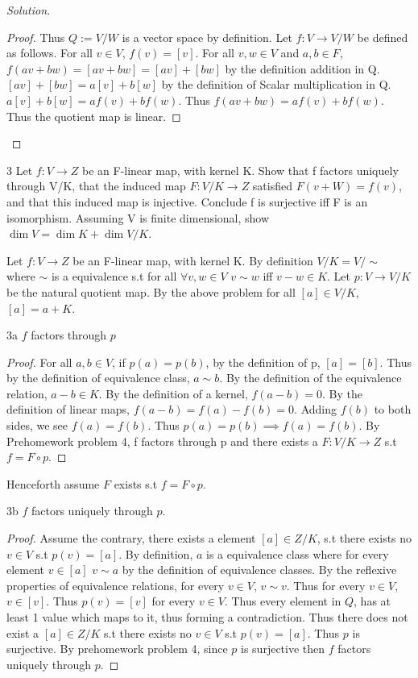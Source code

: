 \documentclass{article}
\newcommand{\rarr}[0]{\rightarrow}
\newenvironment{solution}
{\renewcommand\qedsymbol{$\blacksquare$}\begin{proof}[Solution]}
		{\end{proof}}
\begin{document}
\begin{solution}
\begin{proof}
		Thus $Q := V/W$ is a vector space by definition. Let $f : V \rarr V/W$ be defined as follows. For all $v \in V$, $f(v) = [v]$. For all $v, w \in V$ and $a, b \in F$, $f(av + bw) = [av + bw] = [av] + [bw]$ by the definition addition in Q. $[av] + [bw] = a[v] + b[w]$ by the definition of Scalar multiplication in Q. $a[v] + b[w] = af(v) + bf(w)$. Thus $f(av + bw) = af(v) + bf(w)$. Thus the quotient map is linear.
	\end{proof}
\end{solution}

\bigskip

\begin{PROB}{3}\label{Problem 3.}
    Let $f: V \rarr Z$ be an F-linear map, with kernel K. Show that f factors uniquely through V/K, that the induced map $F: V/K \rarr Z$ satisfied $F(v + W) = f(v)$, and that this induced map is injective. Conclude f is surjective iff F is an isomorphism.  Assuming V is finite dimensional, show $\dim V = \dim K + \dim V/K$. 
\end{PROB}
Let $f: V \rarr Z$ be an F-linear map, with kernel K. By definition $V/K = V/\sim$ where $\sim$ is a equivalence s.t for all $\forall v, w \in V$ $v \sim w$ iff $v - w \in K$. Let $p: V \rarr V/K$ be the natural quotient map. By the above problem for all $[a] \in V/K$, $[a] = a + K$.

\begin{claim}{3a}
    $f$ factors through $p$
\end{claim}
\begin{proof}
    For all $a, b \in V$, if $p(a) = p(b)$, by the definition of p, $[a] = [b]$. Thus by the definition of equivalence class, $a \sim b$. By the definition of the equivalence relation, $a - b \in K$. By the definition of a kernel, $f(a - b) = 0$. By the definition of linear maps, $f(a - b) = f(a) - f(b) = 0$. Adding $f(b)$ to both sides, we see $f(a) = f(b)$. Thus $p(a) = p(b) \implies f(a) = f(b)$. By Prehomework problem 4, f factors through p and there exists a $F : V/K \rarr Z$ s.t $f = F \circ p$. 
\end{proof}

Henceforth assume $F$ exists s.t $f = F \circ p$.

\begin{claim}{3b}
    $f$ factors uniquely through $p$.
\end{claim}
\begin{proof}
    Assume the contrary, there exists a element $[a] \in Z/K$, s.t there exists no $v \in V$ s.t $p(v) = [a]$. By definition, $a$ is a equivalence class where for every element $v \in [a]$ $v \sim a$ by the definition of equivalence classes. By the reflexive properties of equivalence relations, for every $v \in V$, $v \sim v$. Thus for every $v \in V$, $v \in [v]$. Thus $p(v) = [v]$ for every $v \in V$. Thus every element in $Q$, has at least 1 value which maps to it, thus forming a contradiction. Thus there does not exist a $[a] \in Z/K$ s.t there exists no $v \in V$ s.t $p(v) = [a]$. Thus $p$ is surjective. By prehomework problem 4, since $p$ is surjective then $f$ factors uniquely through $p$.
\end{proof}
\end{document}
